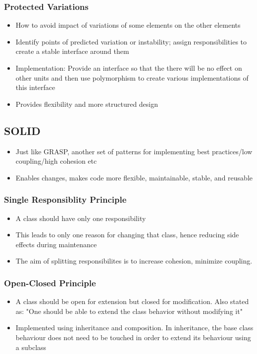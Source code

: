 \documentclass{article}
\begin{document}
\subsubsection{Protected Variations}
\begin{itemize}
    \item How to avoid impact of variations of some elements on the other elements
    
    \item Identify points of predicted variation or instability; assign responsibilities to create a stable interface around them
    
    \item Implementation:  Provide an interface so that the there will be no effect on other units and then use polymorphism to create various implementations of this interface
    
    \item  Provides flexibility and more structured design
\end{itemize}

\subsection{SOLID}
\begin{itemize}
    \item Just like GRASP, another set of patterns for implementing best practices/low coupling/high cohesion etc
    
    \item Enables changes, makes code more flexible, maintainable, stable, and reusable
\end{itemize}

\subsubsection{Single Responsiblity Principle}
\begin{itemize}
    \item A class should have only one responsibility
    
    \item This leads to only one reason for changing that class, hence reducing side effects during maintenance
    
    \item The aim of splitting responsibilites is to increase cohesion, minimize coupling.
\end{itemize}

\subsubsection{Open-Closed Principle}
\begin{itemize}
    \item A class should be open for extension but closed for modification. Also stated as: "One should be able to extend the class behavior without modifying it"
    
    \item Implemented using inheritance and composition. In inheritance, the base class behaviour does not need to be touched in order to extend its behaviour using a subclass
\end{itemize}
\end{document}
